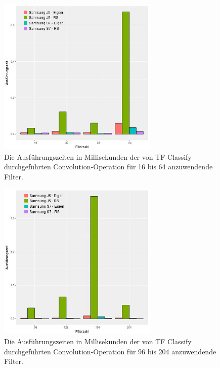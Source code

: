 \begin{figure}[!t]
	\centering
	\includegraphics[width=3.0in]{images/aa-paper-filteranzahl-1-legende.jpg}
	\caption{Die Ausführungszeiten in Millisekunden der von TF Classify durchgeführten Convolution-Operation für 16 bis 64 anzuwendende Filter. }
	\label{fig:filterzahl1}
\end{figure}

\begin{figure}[!t]
	\centering
	\includegraphics[width=3.0in]{images/aa-paper-filteranzahl-2-legende.jpg}
	\caption{Die Ausführungszeiten in Millisekunden der von TF Classify durchgeführten Convolution-Operation für 96 bis 204 anzuwendende Filter. }
	\label{fig:filterzahl2}
\end{figure}

